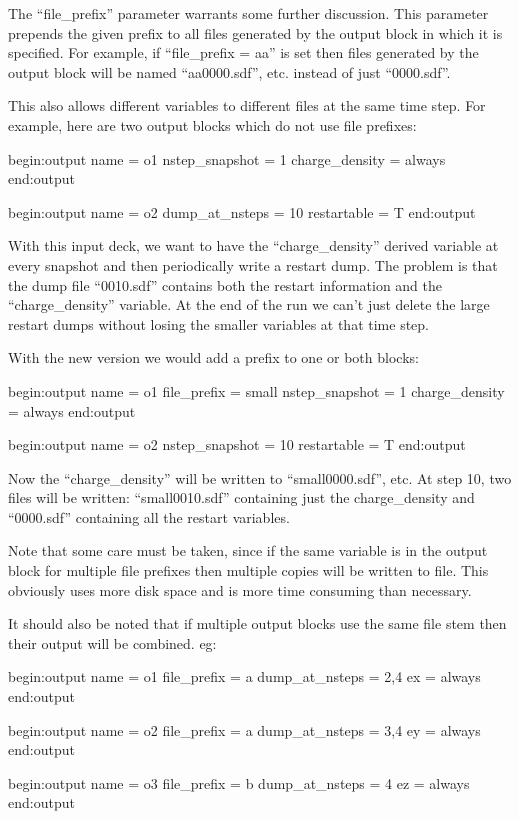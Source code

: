 The ``file\_prefix'' parameter warrants some further discussion. This
parameter prepends the given prefix to all files generated by the output
block in which it is specified.  For example, if ``file\_prefix = aa'' is
set then files generated by the output block will be named ``aa0000.sdf'',
etc. instead of just ``0000.sdf''.

This also allows different variables to different files at the same
time step. For example, here are two output blocks which do not use file
prefixes:
\begin{boxverbatim}
begin:output
   name = o1
   nstep_snapshot = 1
   charge_density = always
end:output

begin:output
   name = o2
   dump_at_nsteps = 10
   restartable = T
end:output
\end{boxverbatim}

With this input deck, we want to have the ``charge\_density''
derived variable at every snapshot and then periodically write a
restart dump. The problem is that the dump file ``0010.sdf''
contains both the restart information and the ``charge\_density''
variable. At the end of the run we can't just delete the large
restart dumps without losing the smaller variables at that
time step.

With the new version we would add a prefix to one or both
blocks:
\begin{boxverbatim}
begin:output
   name = o1
   file_prefix = small
   nstep_snapshot = 1
   charge_density = always
end:output

begin:output
   name = o2
   nstep_snapshot = 10
   restartable = T
end:output
\end{boxverbatim}

Now the ``charge\_density'' will be written to ``small0000.sdf'', etc.
At step 10, two files will be written: ``small0010.sdf'' containing
just the charge\_density and ``0000.sdf'' containing all the restart
variables.

Note that some care must be taken, since if the same variable is
in the output block for multiple file prefixes then multiple
copies will be written to file. This obviously uses more disk
space and is more time consuming than necessary.

It should also be noted that if multiple output blocks use the
same file stem then their output will be combined. eg:
\begin{boxverbatim}
begin:output
   name = o1
   file_prefix = a
   dump_at_nsteps = 2,4
   ex = always
end:output

begin:output
   name = o2
   file_prefix = a
   dump_at_nsteps = 3,4
   ey = always
end:output

begin:output
   name = o3
   file_prefix = b
   dump_at_nsteps = 4
   ez = always
end:output
\end{boxverbatim}

